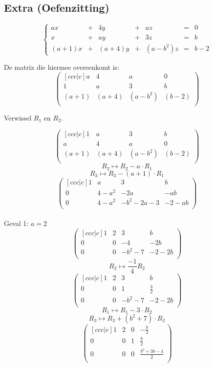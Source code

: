 \documentclass[lineaire_algebra_oplossingen.tex]{subfiles}
\begin{document}
\subsection{Extra (Oefenzitting)}
\[
\left\{
\begin{array}{ccccccc}
ax &+& 4y &+& az &=& 0\\
x  &+& ay &+& 3z &=& b\\
(a+1)x &+& (a+4)y &+& (a-b^{2})z &=& b-2
\end{array}
\right.
\]

De matrix die hiermee overeenkomt is:
\[
\begin{pmatrix}[ccc|c]
a & 4 & a & 0\\
1 & a & 3 & b\\
(a+1) & (a+4) & (a-b^{2}) & (b-2)\\
\end{pmatrix}
\]
\begin{center}
Verwissel $R_1$ en $R_2$.
\end{center}
\[
\begin{pmatrix}[ccc|c]
1 & a & 3 & b\\
a & 4 & a & 0\\
(a+1) & (a+4) & (a-b^{2}) & (b-2)\\
\end{pmatrix}
\]
\[ R_2 \longmapsto R_2 - a\cdot R_1 \]
\[ R_3 \longmapsto R_3 - (a+1)\cdot R_1 \]
\[
\begin{pmatrix}[ccc|c]
1 & a & 3 & b\\
0 & 4-a^{2} & -2a & -ab\\
0 & 4-a^{2} & -b^{2}-2a-3 & -2-ab\\
\end{pmatrix}
\]
\\Geval 1: $a=2$
\[
\begin{pmatrix}[ccc|c]
1 & 2 & 3 & b\\
0 & 0 & -4 & -2b\\
0 & 0 & -b^{2}-7 & -2-2b\\
\end{pmatrix}
\]
\[ R_2 \longmapsto \frac{-1}{4}R_2 \]
\[
\begin{pmatrix}[ccc|c]
1 & 2 & 3 & b\\
0 & 0 & 1 & \frac{b}{2}\\
0 & 0 & -b^{2}-7 & -2-2b\\
\end{pmatrix}
\]
\[ R_1 \longmapsto R_1 - 3\cdot R_2 \]
\[ R_3 \longmapsto R_3 + (b^{2}+7)\cdot R_2 \]
\[
\begin{pmatrix}[ccc|c]
1 & 2 & 0 & -\frac{b}{2}\\
0 & 0 & 1 & \frac{b}{2}\\
0 & 0 & 0 & \frac{b^{3}+3b-4}{2}\\
\end{pmatrix}
\]
\end{document}
